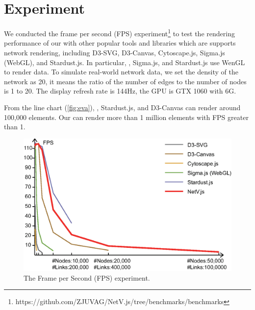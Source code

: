 \section{Experiment}\label{sec:experiment}
We conducted the frame per second (FPS) experiment\footnote{https://github.com/ZJUVAG/NetV.js/tree/benchmarks/benchmarks} to test the rendering performance of our \name with other popular tools and libraries which are supports network rendering, including D3-SVG, D3-Canvas, Cytoscape.js, Sigma.js (WebGL), and Stardust.js. In particular, \name, Sigma.js, and Stardust.js use WenGL to render data. To simulate real-world network data, we set the density of the network as 20, it means the ratio of the number of edges to the number of nodes is 1 to 20. The display refresh rate is 144Hz, the GPU is GTX 1060 with 6G.


From the line chart (\autoref{fig:eva}), \name, Stardust.js, and D3-Canvas can render around 100,000 elements. Our \name can render more than 1 million elements with FPS greater than 1.

\begin{figure}[htbp]
    \includegraphics[width=\linewidth]{fig/eva.eps}
    \caption{
        The Frame per Second (FPS) experiment.
    }
    \label{fig:eva}
\end{figure}